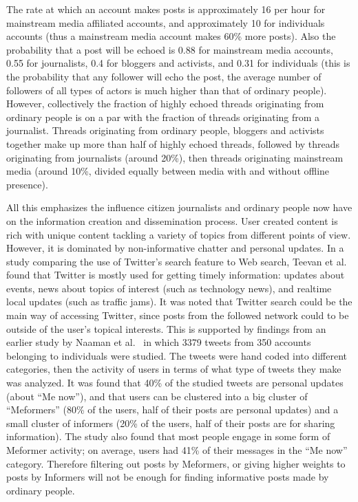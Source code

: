 \documentclass[letterpaper,12pt,titlepage,oneside,final]{book}
\begin{document}
The rate at which an account makes posts is approximately 16 per hour for mainstream media affiliated accounts, and approximately 10 for individuals accounts (thus a mainstream media account makes 60\% more posts). 
Also the probability that a post will be echoed is 0.88 for mainstream media accounts, 0.55 for journalists, 0.4 for bloggers and activists, and 0.31 for individuals 
(this is the probability that any follower will echo the post, the average number of followers of all types of actors is much higher than that of ordinary people).
However, collectively the fraction of highly echoed threads originating from ordinary people is on a par with 
the fraction of threads originating from a journalist. 
Threads originating from ordinary people, bloggers and activists together make up more than half of highly echoed threads, followed by threads originating from journalists (around 20\%), then threads originating mainstream media (around 10\%, divided equally between media with and without offline presence). 

All this emphasizes the influence citizen journalists and ordinary people now have on 
the information creation and dissemination process.
User created content is rich with unique content tackling a variety of topics from different points of view.
However, it is dominated by non-informative chatter and personal updates. 
In a study comparing the use of Twitter's search feature to Web search, 
Teevan et al.~\cite{teevan2011twittersearch} found that
Twitter is mostly used for getting timely information:
updates about events, 
news about topics of interest (such as technology news),
and realtime local updates (such as traffic jams).
It was noted that Twitter search could be the main
way of accessing Twitter, since posts from the followed network 
could to be outside of the user's topical interests. 
This is supported by findings from an earlier study by
Naaman et al.~\cite{naaman2010really} in which
3379 tweets from 350 accounts belonging to individuals
were studied. 
The tweets were hand coded into different categories, 
then the activity of users in terms of
what type of tweets they make was analyzed.
It was found that 40\% of the studied tweets 
are personal updates (about ``Me now''),
and that users can be clustered into
a big cluster of ``Meformers'' 
(80\% of the users, half of their posts are personal updates)
and a small cluster of informers 
(20\% of the users, half of their posts are for sharing information).
The study also found that most people engage
in some form of Meformer activity; 
on average, users had 41\% of their messages
in the ``Me now'' category.
Therefore filtering out posts by Meformers, 
or giving higher weights to posts by Informers 
will not be enough for finding informative posts
made by ordinary people.
\end{document}
